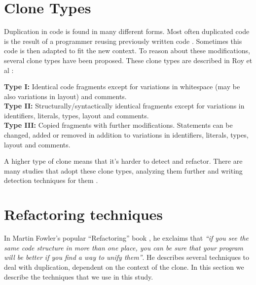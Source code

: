 \section{Clone Types} \label{chap:backgroundclonetypes}
Duplication in code is found in many different forms. Most often duplicated code is the result of a programmer reusing previously written code \cite{haefliger2008code, baxter1998clone}. Sometimes this code is then adapted to fit the new context. To reason about these modifications, several clone types have been proposed. These clone types are described in Roy et al \cite{roy2007survey}:
\begin{displayquote}
\textbf{Type I:} Identical code fragments except for variations in whitespace (may be also variations in layout) and comments.\\
\textbf{Type II:} Structurally/syntactically identical fragments except for variations in identifiers, literals, types, layout and comments.\\
\textbf{Type III:} Copied fragments with further modifications. Statements can be changed, added or removed in addition to variations in identifiers, literals, types, layout and comments.
\end{displayquote}
A higher type of clone means that it's harder to detect and refactor. There are many studies that adopt these clone types, analyzing them further and writing detection techniques for them \cite{sajnani2016sourcerercc, kodhai2010detection, van2019novel}.


\section{Refactoring techniques}
In Martin Fowler's popular ``Refactoring'' book \cite{fowler2018refactoring}, he exclaims that \textit{``if you see the same code structure in more than one place, you can be sure that your program will be better if you find a way to unify them''}. He describes several techniques to deal with duplication, dependent on the context of the clone. In this section we describe the techniques that we use in this study.

